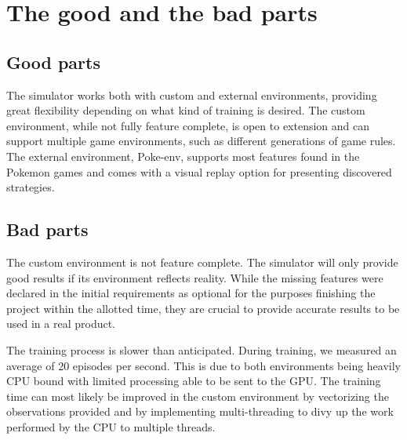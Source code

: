 \section{The good and the bad parts}
\label{sec:good-bad-parts}

\subsection{Good parts}
The simulator works both with custom and external environments, providing great flexibility depending
on what kind of training is desired. The custom environment, while not fully feature complete, is open to extension and
can support multiple game environments, such as different generations of game rules. The external environment, Poke-env, 
supports most features found in the Pokemon games and comes with a visual replay option for presenting discovered strategies.

\subsection{Bad parts}
The custom environment is not feature complete. The simulator will only provide good results if its environment reflects
reality. While the missing features were declared in the initial requirements as optional for the purposes finishing the
project within the allotted time, they are crucial to provide accurate results to be used in a real product.

The training process is slower than anticipated. During training, we measured an average of 20 episodes per second. This 
is due to both environments being heavily CPU bound with limited processing able to be sent to the GPU. The training time
can most likely be improved in the custom environment by vectorizing the observations provided and by implementing 
multi-threading to divy up the work performed by the CPU to multiple threads. 
